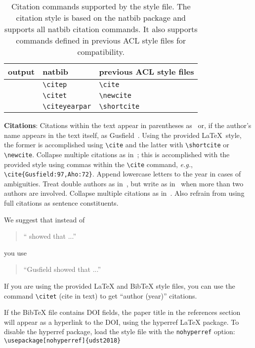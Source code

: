 \documentclass[11pt,a4paper]{article}
\begin{document}
\begin{table*}
\centering
\begin{tabular}{lll}
  output & natbib & previous ACL style files\\
  \hline
  \citep{Gusfield:97} & \verb|\citep| & \verb|\cite| \\
  \citet{Gusfield:97} & \verb|\citet| & \verb|\newcite| \\
  \citeyearpar{Gusfield:97} & \verb|\citeyearpar| & \verb|\shortcite| \\
\end{tabular}
\caption{Citation commands supported by the style file.
  The citation style is based on the natbib package and
  supports all natbib citation commands.
  It also supports commands defined in previous ACL style files
  for compatibility.
  }
\end{table*}

{\bf Citations}: Citations within the text appear in parentheses
as~\cite{Gusfield:97} or, if the author's name appears in the text
itself, as Gusfield~.
Using the provided \LaTeX\ style, the former is accomplished using
{\small\verb|\cite|} and the latter with {\small\verb|\shortcite|} or {\small\verb|\newcite|}.  Collapse multiple citations as in~\cite{Gusfield:97,Aho:72}; this is accomplished with the provided style using commas within the {\small\verb|\cite|} command, {\em e.g.}, {\small\verb|\cite{Gusfield:97,Aho:72}|}.  
Append lowercase letters to the year in cases of ambiguities.  
 Treat double authors as
in~\cite{Aho:72}, but write as in~\cite{Chandra:81} when more than two
authors are involved. Collapse multiple citations as
in~\cite{Gusfield:97,Aho:72}. Also refrain from using full citations
as sentence constituents.


We suggest that instead of
\begin{quote}
  ``\cite{Gusfield:97} showed that ...''
\end{quote}
you use
\begin{quote}
``Gusfield    showed that ...''
\end{quote}

If you are using the provided \LaTeX{} and Bib\TeX{} style files, you
can use the command \verb|\citet| (cite in text)
to get ``author (year)'' citations.

If the Bib\TeX{} file contains DOI fields, the paper
title in the references section will appear as a hyperlink
to the DOI, using the hyperref \LaTeX{} package.
To disable the hyperref package, load the style file
with the \verb|nohyperref| option:
\verb|\usepackage[nohyperref]{udst2018}|
\end{document}
